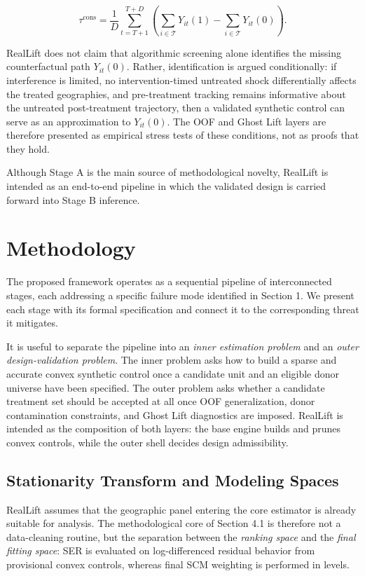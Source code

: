 \documentclass[11pt]{article}
\begin{document}
\[
\tau^{\mathrm{cons}} = \frac{1}{D} \sum_{t=T+1}^{T+D} \left( \sum_{i \in \mathcal{T}} Y_{it}(1) - \sum_{i \in \mathcal{T}} Y_{it}(0) \right).
\]

RealLift does not claim that algorithmic screening alone identifies the missing counterfactual path $Y_{it}(0)$. Rather, identification is argued conditionally: if interference is limited, no intervention-timed untreated shock differentially affects the treated geographies, and pre-treatment tracking remains informative about the untreated post-treatment trajectory, then a validated synthetic control can serve as an approximation to $Y_{it}(0)$. The OOF and Ghost Lift layers are therefore presented as empirical stress tests of these conditions, not as proofs that they hold.

Although Stage A is the main source of methodological novelty, RealLift is intended as an end-to-end pipeline in which the validated design is carried forward into Stage B inference.

\section{Methodology}
The proposed framework operates as a sequential pipeline of interconnected stages, each addressing a specific failure mode identified in Section 1. We present each stage with its formal specification and connect it to the corresponding threat it mitigates.

It is useful to separate the pipeline into an \emph{inner estimation problem} and an \emph{outer design-validation problem}. The inner problem asks how to build a sparse and accurate convex synthetic control once a candidate unit and an eligible donor universe have been specified. The outer problem asks whether a candidate treatment set should be accepted at all once OOF generalization, donor contamination constraints, and Ghost Lift diagnostics are imposed. RealLift is intended as the composition of both layers: the base engine builds and prunes convex controls, while the outer shell decides design admissibility.

\subsection{Stationarity Transform and Modeling Spaces}
RealLift assumes that the geographic panel entering the core estimator is already suitable for analysis. The methodological core of Section 4.1 is therefore not a data-cleaning routine, but the separation between the \emph{ranking space} and the \emph{final fitting space}: SER is evaluated on log-differenced residual behavior from provisional convex controls, whereas final SCM weighting is performed in levels.
\end{document}
